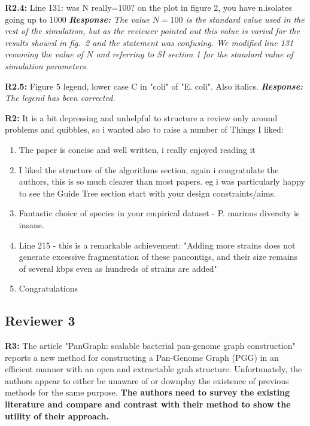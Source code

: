 \documentclass[aps,rmp,onecolumn]{revtex4-1}
\newcommand{\Marco}[1]{{\color{gray}Marco: #1}}
\newcommand{\reviewer}[2]{\textbf{#1:} #2\vskip 5mm}
\newcommand{\response}[1]{{\it {\color{response}\textbf{Response:} #1}}\vskip 5mm}
\begin{document}
\reviewer{R2.4}{Line 131: was N really=100? on the plot in figure 2, you have n.isolates going up to 1000}
\response{The value $N=100$ is the standard value used in the rest of the simulation, but as the reviewer pointed out this value is varied for the results showed in fig.~2 and the statement was confusing. We modified line 131 removing the value of $N$ and referring to SI section 1 for the standard value of simulation parameters.}

\reviewer{R2.5}{Figure 5 legend, lower case C in "coli" of "E. coli". Also italics.}
\response{The legend has been corrected.}


\reviewer{R2}{It is a bit depressing and unhelpful to structure a review only around problems and quibbles, so i wanted also to raise a number of
      Things I liked:

      \begin{enumerate}
            \item The paper is concise and well written, i really enjoyed reading it
            \item I liked the structure of the algorithms section, again i congratulate the authors, this is so much clearer than most papers. eg i was particularly happy to see the Guide Tree section start with your design constraints/aims.
            \item Fantastic choice of species in your empirical dataset - P. marinus diversity is insane.
            \item Line 215 - this is a remarkable achievement: "Adding more strains does not generate excessive fragmentation of these pancontigs, and their size remains of several kbps even as hundreds of strains are added"
            \item Congratulations
      \end{enumerate}
}


\subsection*{Reviewer 3}

\reviewer{R3}{The article "PanGraph: scalable bacterial pan-genome graph construction" reports a new method for constructing a Pan-Genome Graph (PGG) in an efficient manner with an open and extractable grah structure. Unfortunately, the authors appear to either be unaware of or downplay the existence of previous methods for the same purpose.\textbf{ The authors need to survey the existing literature and compare and contrast with their method to show the utility of their approach.}}
\end{document}
